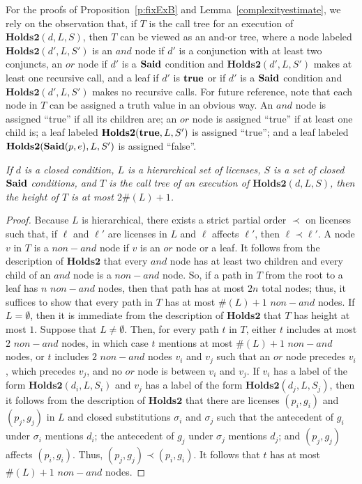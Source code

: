 \documentclass{acmtrans2m}
\newcommand{\prf}{\begin{proof}}
\newcommand{\eprf}{\end{proof}}
\newenvironment{RETHM}[2]{\trivlist \item[\hskip 10pt\hskip\labelsep{\sc #1\hskip 5pt\relax\ref{#2}.}]\it}{\endtrivlist}
\newcommand{\repro}[1]{\begin{RETHM}{Proposition}{#1}}
\newcommand{\erepro}{\end{RETHM}}
\newcommand{\opro}{\repro}
\newcommand{\eopro}{\erepro}
\newcommand{\<}{
}
\renewcommand{\>}{\rangle}
\newcommand{\card}[1]{\#({#1})}
\newcommand{\Said}{\mathit{\bf Said}}
\newcommand{\true}{\mathit{\bf{true}}}
\newcommand{\cd}{d}
\newcommand{\cc}{e}
\newcommand{\CMetTwo}{\textbf{Holds2}}
\newcommand{\andNd}{\mathit{and}}
\newcommand{\orNd}{\mathit{or}}
\newcommand{\nandNd}{\mathit{non-and}}
\begin{document}
For the proofs of Proposition~\ref{p:fixExB} and Lemma~\ref{complexityestimate}, we
rely on the observation that, if $T$ is the call tree for an execution of
$\CMetTwo(\cd, L, S)$, then $T$ can be viewed as an and-or tree, where a node labeled
$\CMetTwo(\cd', L, S')$ is an $\andNd$ node if $\cd'$ is a conjunction with at least
two conjuncts, an $\orNd$ node if $\cd'$ is a $\Said$ condition and
$\CMetTwo(\cd', L, S')$ makes at least one recursive call, and a leaf if $\cd'$ is
$\true$ or if $\cd'$ is a $\Said$ condition and $\CMetTwo(\cd', L, S')$ makes no
recursive calls.  For future reference, note that each node in $T$ can be assigned a
truth value in an obvious way.  An $\andNd$ node is assigned ``true'' if all its
children are; an $\orNd$ node is assigned ``true'' if at least one child is; a leaf
labeled $\CMetTwo(\true, L, S')$ is assigned ``true''; and a leaf labeled
$\CMetTwo(\Said(p,\cc), L, S')$ is assigned ``false''.

\opro{p:fixExB}
If $\cd$ is a closed condition, $L$ is a hierarchical set of licenses, $S$ is a set
of closed $\Said$ conditions, and $T$ is the call tree of an execution of
$\CMetTwo(\cd, L, S)$, then the height of $T$ is at most $2\card{L}+1$.
\eopro
\prf
Because $L$ is hierarchical, there exists a strict partial order $\prec$ on licenses
such that, if $\ell$ and $\ell'$ are licenses in $L$ and $\ell$ affects $\ell'$, then
$\ell\prec\ell'$.  A node $v$ in $T$ is a \emph{$\nandNd$} node if $v$ is an $\orNd$
node or a leaf.  It follows from the description of $\CMetTwo$ that every $\andNd$
node has at least two children and every child of an $\andNd$ node is a $\nandNd$ node.
So, if a path in $T$ from the root to a leaf has $n$ $\nandNd$ nodes, then that path
has at most $2n$ total nodes; thus, it suffices to show that every path in $T$ has at
most $\card{L}+1$ $\nandNd$ nodes.  If $L = \emptyset$, then it is immediate from the
description of $\CMetTwo$ that $T$ has height at most $1$.  Suppose that $L\ne\emptyset$.
Then, for every path $t$ in $T$, either $t$ includes at most $2$ $\nandNd$ nodes, in
which case $t$ mentions at most $\card{L} + 1$ $\nandNd$ nodes, or $t$ includes $2$
$\nandNd$ nodes $v_i$ and $v_j$ such that an $\orNd$ node precedes $v_i$, which precedes
$v_j$, and no $\orNd$ node is between $v_i$ and $v_j$.  If $v_i$ has a label of the form
$\CMetTwo(\cd_i, L, S_i)$ and $v_j$ has a label of the form $\CMetTwo(\cd_j, L, S_j)$,
then it follows from the description of $\CMetTwo$ that there are licenses $(p_i, g_i)$
and $(p_j, g_j)$ in $L$ and closed substitutions $\sigma_i$ and $\sigma_j$ such that the
antecedent of $g_i$ under $\sigma_i$ mentions $\cd_i$; the antecedent of $g_j$ under
$\sigma_j$ mentions $\cd_j$; and $(p_j, g_j)$ affects $(p_i, g_i)$.  Thus,
$(p_j, g_j) \prec (p_i, g_i)$.  It follows that $t$ has at most $\card{L}+1$ $\nandNd$
nodes.
\eprf
\end{document}

